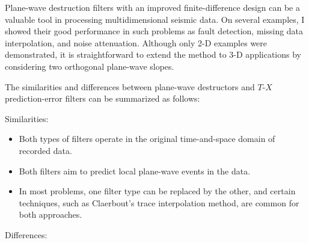 Plane-wave destruction filters with an improved finite-difference
design can be a valuable tool in processing multidimensional seismic
data. On several examples, I showed their good performance in such
problems as fault detection, missing data interpolation, and noise
attenuation. Although only 2-D examples were demonstrated, it
is straightforward to extend the method to 3-D applications by
considering two orthogonal plane-wave slopes.
\par
The similarities
and differences between plane-wave destructors and $T$-$X$
prediction-error filters can be summarized as follows:
\par
\noindent Similarities:
\begin{itemize}
\item Both types of filters operate in the original time-and-space
  domain of recorded data.
\item Both filters aim to predict local plane-wave events in the data.
\item In most problems, one filter type can be replaced by the other,
  and certain techniques, such as Claerbout's trace interpolation
  method, are common for both approaches.
\end{itemize}
Differences:
